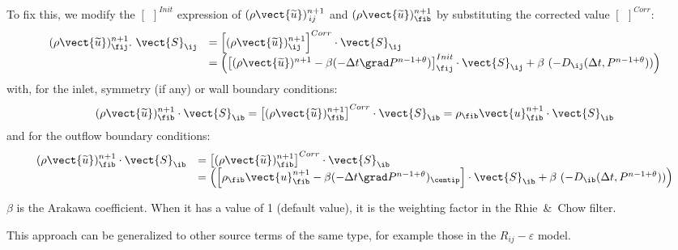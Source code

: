To fix this, we modify the $\left[{\ \ }\right]^{Init}$ expression of $(\rho
\vect{\widetilde{u}})^{n+1}_{\,ij}$ and $(\rho\vect{\widetilde{u}})^{n+1}_{\fib}$
by substituting the corrected value  $\left[{\ \ }\right]^{Corr}$:
\begin{equation}
\begin{array}{ll}
(\rho \vect{\widetilde{u}})^{n+1}_{\fij}.\ \vect{S}_{\ij}&=
\left[(\rho \vect{\widetilde{u}})^{n+1}_{\ij}\right]^{Corr} \cdot \vect{S}_{\ij}\\
&= \left(\left[(\rho \vect{\widetilde{u}})^{n+1}-\beta(-\Delta t \grad P^{n-1+\theta})\right]^{Init}_{\fij} \cdot \vect{S}_{\ij}
+\beta\ (-D_{\ij}(\Delta t, P^{n-1+\theta}))\right)\end{array}
\end{equation}
with, for the inlet, symmetry (if any) or wall boundary conditions:
\begin{equation}\notag
(\rho \vect{\widetilde{u}})^{n+1}_{\fib} \cdot \vect{S}_{\ib}=
\left[(\rho \vect{\widetilde{u}})^{n+1}_{\fib}\right]^{Corr} \cdot \vect{S}_{\ib}=
\rho_{\fib}\vect{u}^{n+1}_{\fib} \cdot \vect{S}_{\ib}
\end{equation}
%
and for the outflow boundary conditions:
\begin{equation*}
\begin{array}{ll}
(\rho \vect{\widetilde{u}})^{n+1}_{\fib} \cdot \vect{S}_{\ib}& =
\left[(\rho \vect{\widetilde{u}})^{n+1}_{\fib}\right]^{Corr} \cdot \vect{S}_{\ib}
\\&= \left( \left[\rho _{\fib}\vect{u}^{n+1}_{\fib}-\beta(-\Delta t
\grad P^{n-1+\theta})_{\centip}\right] \cdot \vect{S}_{\ib}
+\beta\ (-D_{\ib}(\Delta t,
P^{n-1+\theta}))\right)\end{array}
\end{equation*}

$\beta$ is the Arakawa coefficient. When it has a value of 1 (default value), it is the weighting factor in the Rhie~\&~Chow filter.

\begin{remark}
This approach can be generalized to other source terms of the same type,
for example those in the $R_{ij}-\varepsilon$ model.
\end{remark}

